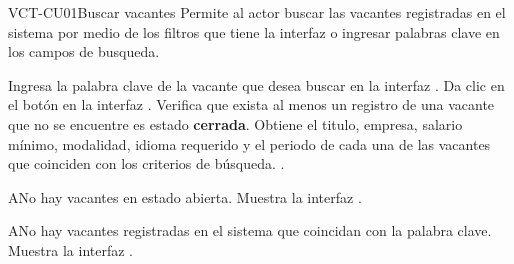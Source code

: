 \begin{UseCase}[]{VCT-CU01}{Buscar vacantes}{
	Permite al actor buscar las vacantes registradas en el sistema por medio de los filtros que tiene la interfaz o
	ingresar palabras clave en los campos de busqueda.
	}
\end{UseCase}

\begin{UCtrayectoria}
	\UCpaso [\UCactor] Ingresa la palabra clave de la vacante que desea buscar en la interfaz .
	\UCpaso [\UCactor] Da clic en el botón  en la interfaz .
    \UCpaso [\UCsist] Verifica que exista al menos un registro de una vacante que no se encuentre es estado \textbf{cerrada}.
	\UCpaso [\UCsist] Obtiene el titulo, empresa, salario mínimo, modalidad, idioma requerido y el periodo de cada una de las vacantes que coinciden con los criterios de búsqueda.
	.
\end{UCtrayectoria}

\begin{UCtrayectoriaA}{A}{No hay vacantes en estado abierta.}
	\UCpaso [\UCsist] Muestra la interfaz .
\end{UCtrayectoriaA}

\begin{UCtrayectoriaA}{A}{No hay vacantes registradas en el sistema que coincidan con la palabra clave.}
	\UCpaso [\UCsist] Muestra la interfaz .
\end{UCtrayectoriaA}
